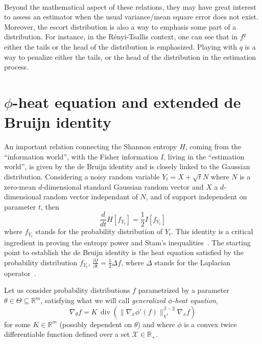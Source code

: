 \documentclass[entropy,article,submit,moreauthors,pdftex]{Definitions/mdpi}
\newcommand{\SZ}[1]{{\color{blue} #1}}                                       %
\def\Rset{\mathbb{R}}%
\def\X{\mathcal{X}}%
\def\div{\operatorname{div}}%
\begin{document}
\

Beyond the mathematical aspect of these  relations, they may have great interest
to  assess an  estimator  when the  usual variance/mean  square  error does  not
exist. Moreover, the escort distribution is also  a way to emphasis some part of
a distribution. For  instance, in the R\'enyi-Tsallis context, one  can see that
in $f^q$ either the tails or the head of the distribution is emphasized. Playing
with $q$ is a way to penalize either  the tails, or the head of the distribution
in the estimation process.




\section{$\phi$-heat equation and extended de Bruijn identity}
\label{sec:deBruijn}

An  important relation  connecting  the  Shannon entropy  $H$,  coming from  the
``information  world'',  with   the  Fisher  information  $I$,   living  in  the
``estimation world'', is  given by the de Bruijn identity  and is closely linked
to the  Gaussian distribution. Considering  a noisy random  variable $Y_t =  X +
\sqrt{t} N$  where $N$ is  a zero-mean $d$-dimensional standard  Gaussian random
vector  and $X$  a  $d$-dimensional random  vector independant  of  $N$, and  of
support independent on  parameter $t$, then $$\frac{d}{dt}  H[f_{Y_t}] = \frac12
I[f_{Y_t}]$$ where $f_{Y_t}$  stands for the probability  distribution of $Y_t$.
This identity is  a critical ingredient in proving the  entropy power and Stam's
inequalities~\cite{CovTho06}.   The starting  point to  establish the  de Bruijn
identity  is  the  heat  equation  satisfied  by  the  probability  distribution
$f_{Y_t}$, $\frac{\partial  f}{\partial t} =  \frac12 \Delta f$,  where $\Delta$
stands for the Laplacian operator~\cite{Wid75}.


Let  us  consider probability  distributions  $f$  parametrized by  a  parameter
$\theta  \in  \Theta \subseteq  \Rset^m$,  satisfying  what  we will  call  {\em
  generalized $\phi$-heat equation},
%
\begin{equation}
\label{eq:phi-heat_equation}
\nabla_\theta f = K \, \div\left( \| \nabla_x \phi'(f) \|_{\chi^*}^{\beta-2}
\nabla_x f \right)
\end{equation}
%
for some $K \in \Rset^m$ (possibly dependent  on $\theta$) and where $\phi$ is a
convex twice differentiable function defined over a set $\X \in \Rset_+$.
\end{document}
